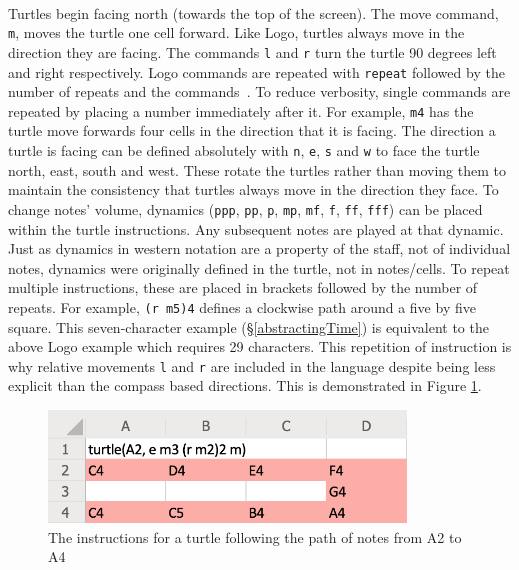 \paragraph{} Turtles begin facing north (towards the top of the screen). The move command, \texttt{m}, moves the turtle one cell forward. Like Logo, turtles always move in the direction they are facing. The commands \texttt{l} and \texttt{r} turn the turtle 90 degrees left and right respectively. Logo commands are repeated with \texttt{repeat} followed by the number of repeats and the commands~\cite{goldman:turtle}. To reduce verbosity, single commands are repeated by placing a number immediately after it. For example, \texttt{m4} has the turtle move forwards four cells in the direction that it is facing. The direction a turtle is facing can be defined absolutely with \texttt{n}, \texttt{e}, \texttt{s} and \texttt{w} to face the turtle north, east, south and west. These rotate the turtles rather than moving them to maintain the consistency that turtles always move in the direction they face. To change notes' volume, dynamics (\texttt{ppp}, \texttt{pp}, \texttt{p}, \texttt{mp}, \texttt{mf}, \texttt{f}, \texttt{ff}, \texttt{fff}) can be placed within the turtle instructions. Any subsequent notes are played at that dynamic. Just as dynamics in western notation are a property of the staff, not of individual notes, dynamics were originally defined in the turtle, not in notes/cells. To repeat multiple instructions, these are placed in brackets followed by the number of repeats. For example, \texttt{(r m5)4} defines a clockwise path around a five by five square. This seven-character example (\S\ref{abstractingTime}) is equivalent to the above Logo example which requires 29 characters. This repetition of instruction is why relative movements \texttt{l} and \texttt{r} are included in the language despite being less explicit than the compass based directions. This is demonstrated in Figure \ref{prep:language1}.

\begin{figure}[ht]
  \centerline{\includegraphics[width=95mm]{figs/sheetDiss1.png}}
\caption{The instructions for a turtle following the path of notes from A2 to A4}
\label{prep:language1}
\end{figure}

